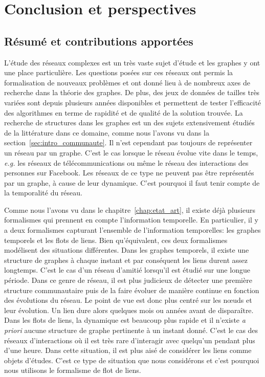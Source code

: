 \chapter{Conclusion et perspectives}


\section{Résumé et contributions apportées}

L'étude des réseaux complexes est un très vaste sujet d'étude et les graphes y ont une place particulière.
Les questions posées sur ces réseaux ont permis la formalisation de nouveaux problèmes et ont donné lieu à de nombreux axes de recherche dans la théorie des graphes.
De plus, des jeux de données de tailles très variées sont depuis plusieurs années disponibles et permettent de tester l'efficacité des algorithmes en terme de rapidité et de qualité de la solution trouvée.
La recherche de structures dans les graphes est un des sujets extensivement étudiés de la littérature dans ce domaine, comme nous l'avons vu dans la section~\ref{sec:intro_communaute}.
Il n'est cependant pas toujours de représenter un réseau par un graphe.
C'est le cas lorsque le réseau évolue vite dans le temps, \emph{e.g.} les réseaux de télécommunications ou même le réseau des interactions des personnes sur Facebook.
Les réseaux de ce type ne peuvent pas être représentés par un graphe, à cause de leur dynamique.
C'est pourquoi il faut tenir compte de la temporalité du réseau.


Comme nous l'avons vu dans le chapitre~\ref{chap:etat_art}, il existe déjà plusieurs formalismes qui prennent en compte l'information temporelle.
En particulier, il y a deux formalismes capturant l'ensemble de l'information temporelles: les graphes temporels et les flots de liens.
Bien qu'équivalent, ces deux formalismes modélisent des situations différentes.
Dans les graphes temporels, il existe une structure de graphes à chaque instant et par conséquent les liens durent assez longtemps.
C'est le cas d'un réseau d'amitié lorsqu'il est étudié sur une longue période.
Dans ce genre de réseau, il est plus judicieux de détecter une première structure communautaire puis de la faire évoluer de manière continue en fonction des évolutions du réseau.
Le point de vue est donc plus centré sur les n\oe uds et leur évolution.
Un lien dure alors quelques mois ou années avant de disparaître.
Dans les flots de liens, la dynamique est beaucoup plus rapide et il n'existe \emph{a priori} aucune structure de graphe pertinente à un instant donné.
C'est le cas des réseaux d'interactions où il est très rare d'interagir avec quelqu'un pendant plus d'une heure.
Dans cette situation, il est plus aisé de considérer les liens comme objets d'études.
C'est ce type de situation que nous considérons et c'est pourquoi nous utilisons le formalisme de flot de liens.


